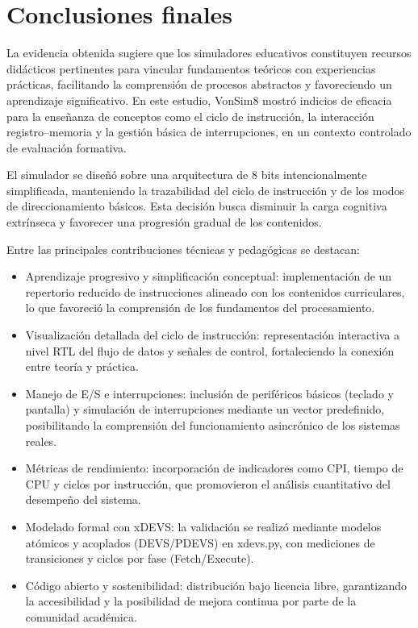 \documentclass[12pt,oneside]{templates/unerthesis}
\providecommand{\tightlist}{%
  \setlength{\itemsep}{0pt}\setlength{\parskip}{0pt}}
\begin{document}
\hypertarget{conclusiones}{%
\chapter{Conclusiones finales}\label{conclusiones}}

La evidencia obtenida sugiere que los simuladores educativos constituyen recursos didácticos pertinentes para vincular fundamentos teóricos con experiencias prácticas, facilitando la comprensión de procesos abstractos y favoreciendo un aprendizaje significativo. En este estudio, VonSim8 mostró indicios de eficacia para la enseñanza de conceptos como el ciclo de instrucción, la interacción registro--memoria y la gestión básica de interrupciones, en un contexto controlado de evaluación formativa.

El simulador se diseñó sobre una arquitectura de 8 bits intencionalmente simplificada, manteniendo la trazabilidad del ciclo de instrucción y de los modos de direccionamiento básicos. Esta decisión busca disminuir la carga cognitiva extrínseca y favorecer una progresión gradual de los contenidos.

Entre las principales contribuciones técnicas y pedagógicas se destacan:

\begin{itemize}
\tightlist
\item
  Aprendizaje progresivo y simplificación conceptual: implementación de un repertorio reducido de instrucciones alineado con los contenidos curriculares, lo que favoreció la comprensión de los fundamentos del procesamiento.\\
\item
  Visualización detallada del ciclo de instrucción: representación interactiva a nivel RTL del flujo de datos y señales de control, fortaleciendo la conexión entre teoría y práctica.\\
\item
  Manejo de E/S e interrupciones: inclusión de periféricos básicos (teclado y pantalla) y simulación de interrupciones mediante un vector predefinido, posibilitando la comprensión del funcionamiento asincrónico de los sistemas reales.\\
\item
  Métricas de rendimiento: incorporación de indicadores como CPI, tiempo de CPU y ciclos por instrucción, que promovieron el análisis cuantitativo del desempeño del sistema.\\
\item
  Modelado formal con xDEVS: la validación se realizó mediante modelos atómicos y acoplados (DEVS/PDEVS) en xdevs.py, con mediciones de transiciones y ciclos por fase (Fetch/Execute).\\
\item
  Código abierto y sostenibilidad: distribución bajo licencia libre, garantizando la accesibilidad y la posibilidad de mejora continua por parte de la comunidad académica.
\end{itemize}
\end{document}
